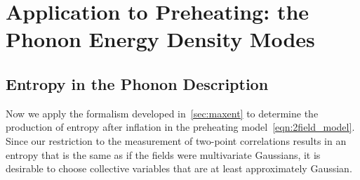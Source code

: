 \documentclass[11pt,a4paper]{article}
\begin{document}
\section{Application to Preheating: the Phonon Energy Density Modes}
\label{sec:phonons_m2g2}
\subsection{Entropy in the Phonon Description}
Now we apply the formalism developed in~\ref{sec:maxent} to determine the production of entropy after inflation in the preheating model~\eqref{eqn:2field_model}.
Since our restriction to the measurement of two-point correlations results in an entropy that is the same as if the fields were multivariate Gaussians, it is desirable to 
choose collective variables that are at least approximately Gaussian.
\end{document}
